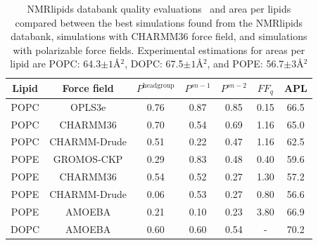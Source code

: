 \documentclass[journal=jacsat,manuscript=article,layout=singlecolumn]{achemso}
\begin{document}
\begin{table}[]
    \centering
    \begin{tabular}{c c c c c c c}
        Lipid & Force field & $P^{\mathrm{headgroup}}$ & $P^{sn-1}$ & $P^{sn-2}$ & $FF_{q}$ & APL \\
        \hline
        POPC & OPLS3e       & 0.76 & 0.87 & 0.85 & 0.15 & 66.5\\
        POPC & CHARMM36     & 0.70 & 0.54 & 0.69 & 1.16 & 65.0\\
        POPC & CHARMM-Drude & 0.51 & 0.22 & 0.47 & 1.16 & 62.5\\
        \hline
        POPE & GROMOS-CKP & 0.29 & 0.83 & 0.48 & 0.40 & 59.6\\
        POPE & CHARMM36   & 0.54 & 0.52 & 0.27 & 1.30 & 57.2 \\
        POPE & CHARMM-Drude & 0.06 & 0.53 & 0.27 & 0.80 & 56.6  \\
        POPE & AMOEBA & 0.21 & 0.10 & 0.23 & 3.80 & 66.9\\
        \hline
        DOPC & AMOEBA & 0.60 & 0.60 & 0.54 & - & 70.2\\
    \end{tabular}
    \caption{NMRlipids databank quality evaluations~\cite{Databank} and area per lipids compared between the best simulations found from the NMRlipids databank, simulations with CHARMM36 force field, and simulations with polarizable force fields. Experimental estimations for areas per lipid are POPC: 64.3$\pm1$\AA$^{2}$\cite{kucerka2011}, DOPC: 67.5$\pm1$\AA$^{2}$\cite{kucerka2008}, and POPE: 56.7$\pm$3\AA$^{2}$\cite{Rickeard2020}}
    \label{tab:my_label}
\end{table}

\end{document}
